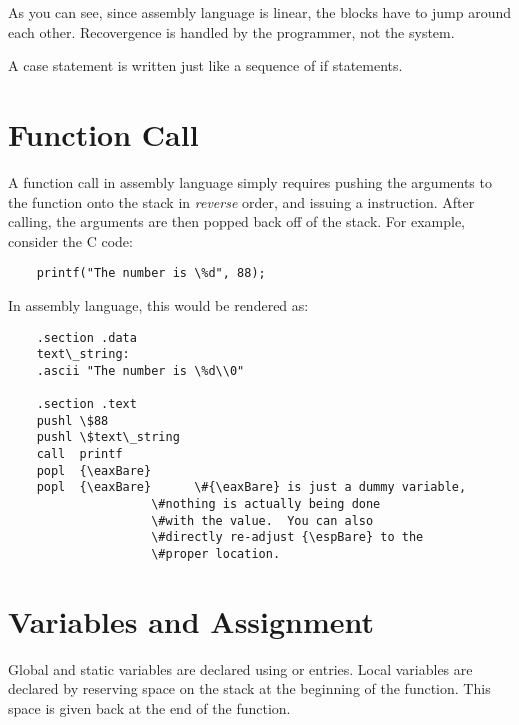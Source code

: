 As you can see, since assembly language is linear, the blocks have to
jump around each other.  Recovergence is handled by the programmer, not
the system.

A case statement is written just like a sequence of if statements.

\section{Function Call}

A function call in assembly language simply requires pushing the arguments
to the function onto the stack in \emph{reverse} order, and
issuing a  instruction.  After calling, the arguments
are then popped back off of the stack.  For example, consider
the C code:

\begin{simpletyping}
\begin{lstlisting}
	printf("The number is \%d", 88);
\end{lstlisting}
\end{simpletyping}

In assembly language, this would be rendered as:

\begin{simpletyping}
\begin{lstlisting}
	.section .data
	text\_string:
	.ascii "The number is \%d\\0"

	.section .text
	pushl \$88
	pushl \$text\_string
	call  printf
	popl  {\eaxBare}
	popl  {\eaxBare}      \#{\eaxBare} is just a dummy variable,
	                \#nothing is actually being done 
	                \#with the value.  You can also 
	                \#directly re-adjust {\espBare} to the
	                \#proper location.
\end{lstlisting}
\end{simpletyping}

\section{Variables and Assignment}

 
Global and static variables are declared using
 or  entries.  Local
variables are declared by reserving space on the stack at the
beginning of the function.  This space is given back at the end of the
function.  

